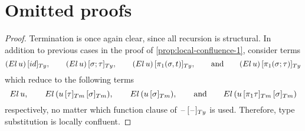 \documentclass[a4paper,UKenglish,numberwithinsect,cleveref,thm-restate]{lipics-v2021}
\begin{document}
\section{Omitted proofs}\label{appendix:proofs}

\propConfluenceTwo*
\begin{proof}
  Termination is once again clear, since all recursion is structural.
  In addition to previous cases in the proof of \cref{prop:local-confluence-1}, consider terms
  \[
    \subTy{(\El\,u)}{\idS}, \qquad \subTy{(\El\,u)}{\sigma;\tau}, \qquad \subTy{(\El\,u)}{\pi_1(\sigma, t)}, \qquad\text{and}\qquad \subTy{(\El\,u)}{\pi_1(\sigma; \tau)}
  \]
  which reduce to the following terms
  \[
    \El\,u, \qquad \El\,(\subTm{\subTm{u}{\tau}}{\sigma}), \qquad \El\,(\subTm{u}{\sigma}), \qquad\text{and}\qquad
    \El\,(\subTm{\subTm{u}{\pi_1\tau}}{\sigma})
  \]
  respectively, no matter which function clause of $\subTy{\blank}{\blank}$ is used.
  Therefore, type substitution is locally confluent.
\end{proof}
\end{document}
